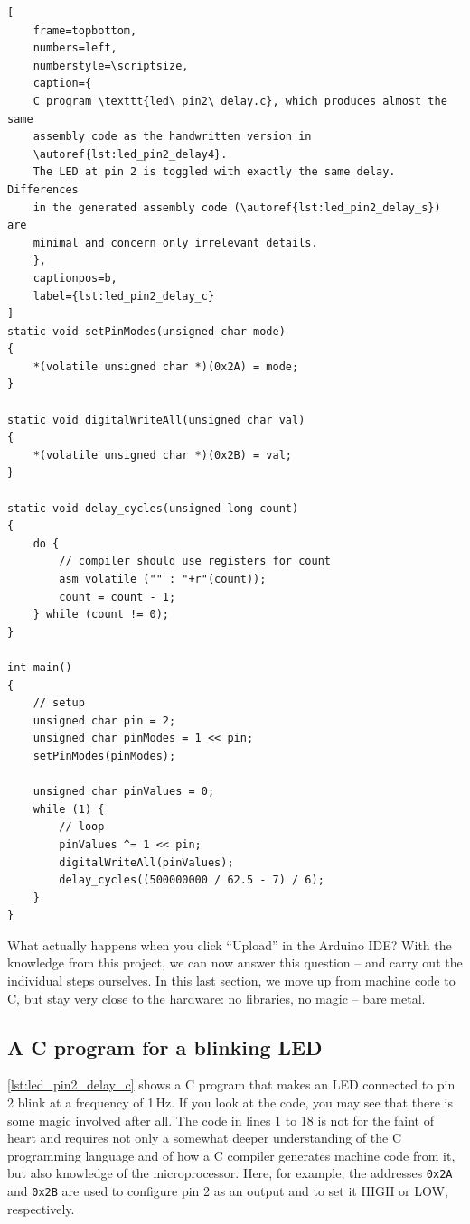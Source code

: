 \documentclass[a4paper,12pt]{article}
\begin{document}
\begin{listing}[htbp]
\begin{lstlisting}[
    frame=topbottom,
    numbers=left,
    numberstyle=\scriptsize,
    caption={
	C program \texttt{led\_pin2\_delay.c}, which produces almost the same
	assembly code as the handwritten version in
	\autoref{lst:led_pin2_delay4}.
	The LED at pin 2 is toggled with exactly the same delay. Differences
	in the generated assembly code (\autoref{lst:led_pin2_delay_s}) are
	minimal and concern only irrelevant details.
    },
    captionpos=b,
    label={lst:led_pin2_delay_c}
]
static void setPinModes(unsigned char mode)
{
    *(volatile unsigned char *)(0x2A) = mode;
}

static void digitalWriteAll(unsigned char val)
{
    *(volatile unsigned char *)(0x2B) = val;
}

static void delay_cycles(unsigned long count)
{
    do {
        // compiler should use registers for count
        asm volatile ("" : "+r"(count));
        count = count - 1;
    } while (count != 0);
}

int main()
{
    // setup
    unsigned char pin = 2;
    unsigned char pinModes = 1 << pin;
    setPinModes(pinModes);

    unsigned char pinValues = 0;
    while (1) {
        // loop
        pinValues ^= 1 << pin;
        digitalWriteAll(pinValues);
        delay_cycles((500000000 / 62.5 - 7) / 6);
    }
}
\end{lstlisting}
\end{listing}

\noindent
What actually happens when you click ``Upload'' in the Arduino IDE? With the
knowledge from this project, we can now answer this question – and carry out
the individual steps ourselves. In this last section, we move up from machine
code to C, but stay very close to the hardware: no libraries, no magic – bare
metal.

\subsection{A C program for a blinking LED}
\autoref{lst:led_pin2_delay_c} shows a C program that makes an LED connected
to pin 2 blink at a frequency of 1\,Hz. If you look at the code, you may see
that there is some magic involved after all.
The code in lines 1 to 18 is not for the faint of heart and requires not only
a somewhat deeper understanding of the C programming language and of how a C
compiler generates machine code from it, but also knowledge of the
microprocessor. Here, for example, the addresses \texttt{0x2A} and
\texttt{0x2B} are used to configure pin 2 as an output and to set it HIGH or
LOW, respectively.
\end{document}
